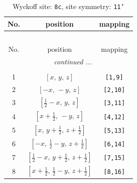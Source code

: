 \documentclass[fleqn,8pt]{jsarticle}
\begin{document}
\renewcommand{\arraystretch}{1.2}
\begin{longtable}{ccc}
\caption{Wyckoff site: {\tt 8c}, site symmetry: {\tt 11'}}
 \\
 \hline \hline
No. & position & mapping \\ \hline \endfirsthead

\multicolumn{2}{l}{\tablename\ \thetable{}} \\
 \hline \hline
No. & position & mapping \\ \hline \endhead

 \hline \hline
\multicolumn{2}{r}{\footnotesize\it continued ...} \\ \endfoot

 \hline \hline
\multicolumn{2}{r}{} \\ \endlastfoot

1 & $\left[ x,\, y,\, z \right]$ & {\tt [1,9]} \\ \hline
2 & $\left[ - x,\, - y,\, z \right]$ & {\tt [2,10]} \\ \hline
3 & $\left[ \frac{1}{2} - x,\, y,\, z \right]$ & {\tt [3,11]} \\ \hline
4 & $\left[ x + \frac{1}{2},\, - y,\, z \right]$ & {\tt [4,12]} \\ \hline
5 & $\left[ x,\, y + \frac{1}{2},\, z + \frac{1}{2} \right]$ & {\tt [5,13]} \\ \hline
6 & $\left[ - x,\, \frac{1}{2} - y,\, z + \frac{1}{2} \right]$ & {\tt [6,14]} \\ \hline
7 & $\left[ \frac{1}{2} - x,\, y + \frac{1}{2},\, z + \frac{1}{2} \right]$ & {\tt [7,15]} \\ \hline
8 & $\left[ x + \frac{1}{2},\, \frac{1}{2} - y,\, z + \frac{1}{2} \right]$ & {\tt [8,16]} \\
\end{longtable}
\end{document}
